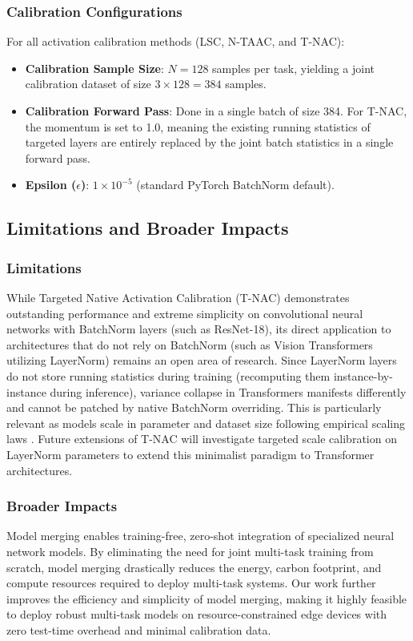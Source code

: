 \documentclass{article}
\theoremstyle{plain}
\theoremstyle{definition}
\begin{document}
\subsubsection{Calibration Configurations}
For all activation calibration methods (LSC, N-TAAC, and T-NAC):
\begin{itemize}
    \item \textbf{Calibration Sample Size}: $N=128$ samples per task, yielding a joint calibration dataset of size $3 \times 128 = 384$ samples.
    \item \textbf{Calibration Forward Pass}: Done in a single batch of size 384. For T-NAC, the momentum is set to 1.0, meaning the existing running statistics of targeted layers are entirely replaced by the joint batch statistics in a single forward pass.
    \item \textbf{Epsilon ($\epsilon$)}: $1 \times 10^{-5}$ (standard PyTorch BatchNorm default).
\end{itemize}

\subsection{Limitations and Broader Impacts}

\subsubsection{Limitations}
While Targeted Native Activation Calibration (T-NAC) demonstrates outstanding performance and extreme simplicity on convolutional neural networks with BatchNorm layers (such as ResNet-18), its direct application to architectures that do not rely on BatchNorm (such as Vision Transformers \cite{dosovitskiy2021an} utilizing LayerNorm) remains an open area of research. Since LayerNorm layers do not store running statistics during training (recomputing them instance-by-instance during inference), variance collapse in Transformers manifests differently and cannot be patched by native BatchNorm overriding. This is particularly relevant as models scale in parameter and dataset size following empirical scaling laws \cite{kaplan2020scaling}. Future extensions of T-NAC will investigate targeted scale calibration on LayerNorm parameters to extend this minimalist paradigm to Transformer architectures.

\subsubsection{Broader Impacts}
Model merging enables training-free, zero-shot integration of specialized neural network models. By eliminating the need for joint multi-task training from scratch, model merging drastically reduces the energy, carbon footprint, and compute resources required to deploy multi-task systems. Our work further improves the efficiency and simplicity of model merging, making it highly feasible to deploy robust multi-task models on resource-constrained edge devices with zero test-time overhead and minimal calibration data.
\end{document}
